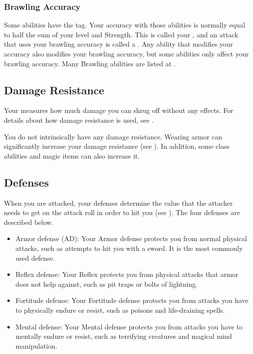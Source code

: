     \subsubsection{Brawling Accuracy}\label{Brawling Accuracy}
      Some abilities have the  tag.
      Your accuracy with those abilities is normally equal to half the sum of your level and Strength.
      This is called your , and an attack that uses your brawling accuracy is called a .
      Any ability that modifies your accuracy also modifies your brawling accuracy, but some abilities only affect your brawling accuracy.
      Many Brawling abilities are listed at .

  \subsection{Damage Resistance}\label{Damage Resistance}
    Your  measures how much damage you can shrug off without any effects.
    For details about how damage resistance is used, see .

    You do not intrinsically have any damage resistance.
    Wearing armor can significantly increase your damage resistance (see ).
    In addition, some class abilities and magic items can also increase it.

  \subsection{Defenses}\label{Defenses}
    When you are attacked, your defenses determine the value that the attacker needs to get on the attack roll in order to hit you (see ).
    The four defenses are described below.
    \begin{itemize}
      \item Armor defense (AD): Your Armor defense protects you from normal physical attacks, such as attempts to hit you with a sword.
        It is the most commonly used defense.
      \item Reflex defense: Your Reflex protects you from physical attacks that armor does not help against, such as pit traps or bolts of lightning.
      \item Fortitude defense: Your Fortitude defense protects you from attacks you have to physically endure or resist, such as poisons and life-draining spells.
      \item Mental defense: Your Mental defense protects you from attacks you have to mentally endure or resist, such as terrifying creatures and magical mind manipulation.
    \end{itemize}

